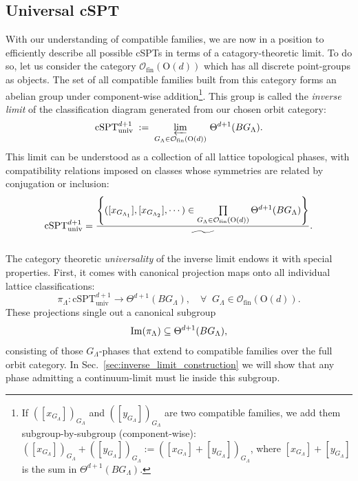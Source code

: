 \documentclass[aps,prx,reprint,superscriptaddress,twocolumn,amsmath,amssymb,amsfonts, nofootinbib]{revtex4-2}
\newcommand{\im}{{\rm Im}}
\newcommand{\csptu}{\mathrm{cSPT}^{d+1}_{\mathrm{univ}}}
\newcommand{\ofin}{\mathcal{O}_{\text{fin}}}
\theoremstyle{apsstyle}
\begin{document}
\subsection{Universal cSPT}\label{sec:univCSPT}
With our understanding of compatible families, we are now in a position to  efficiently describe all possible cSPTs in terms of a catagory-theoretic limit. To do so, let us consider the category $\ofin(\mathrm{O}(d))$ which has all discrete point-groups as objects. The set of all compatible families built from this category forms an abelian group under component-wise addition\footnote{If $([x_{G_{\Lambda}}])_{G_{\Lambda}}$ and $([y_{G_{\Lambda}}])_{G_{\Lambda}}$ are two compatible families, we add them subgroup-by-subgroup (component-wise): $([x_{G_{\Lambda}}])_{G_{\Lambda}}+([y_{G_{\Lambda}}])_{G_{\Lambda}}:=([x_{G_{\Lambda}}]+[y_{G_{\Lambda}}])_{G_{\Lambda}}$, where $[x_{G_{\Lambda}}]+[y_{G_{\Lambda}}]$ is the sum in $\Theta^{d+1}(BG_{\Lambda})$.\label{footnote_comp}}. This group is called the \emph{inverse limit} of the classification diagram generated from our chosen orbit category:
\begin{equation*}
   \csptu
   \;:=\;
   \varprojlim_{G_{\Lambda}\in\ofin(\mathrm{O}(d))}\,
      \Theta^{d+1}(BG_{\Lambda}).
\end{equation*}
\noindent This limit can be understood as a collection of all lattice topological phases, with compatibility relations imposed on classes whose symmetries are related by conjugation or inclusion:
\begin{equation}
  \csptu =\dfrac{\left\{([x_{G_{\Lambda_{1}}}], [x_{G_{\Lambda_{2}}}], \cdots) \in \prod\limits_{G_{\Lambda}\in \ofin(\mathrm{O}(d))} \Theta^{d+1}(BG_{\Lambda}) \right\}}{\raisebox{-1.5ex}{$\widetilde{\phantom{XXXX}}$}}.
  \label{eq:cspt_equiv}
\end{equation} 

The category theoretic \textit{universality} of the inverse limit endows it with special properties. First, it comes with canonical projection maps onto all individual lattice classifications: 
\begin{equation*}
\pi_{\Lambda}: \csptu \to \Theta^{d+1}(BG_{\Lambda}),\quad \forall \;\; G_{\Lambda}\in \ofin(\mathrm{O}(d)). 
\end{equation*}
\noindent 
These projections single out a canonical subgroup
\begin{equation*}
    \im(\pi_{\Lambda})\subseteq \Theta^{d+1}(BG_{\Lambda}),
\end{equation*}
consisting of those $G_{\Lambda}$-phases that extend to compatible families over the full orbit category. In Sec.~\ref{sec:inverse_limit_construction} we will show that any phase admitting a continuum-limit must lie inside this subgroup.
\end{document}
